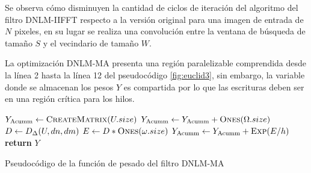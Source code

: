 Se observa c\'omo disminuyen la cantidad de ciclos de iteración del algoritmo del filtro DNLM-IIFFT respecto a la versión original para una imagen de entrada  de $N$ pixeles, en su lugar se realiza una convolución entre la ventana de búsqueda \mat{\Omega} de tama\~no $S$ y el vecindario de tama\~no $W$. 

La optimización DNLM-MA presenta una región paralelizable comprendida desde la línea 2 hasta la línea 12 del pseudoc\'odigo \ref{fig:euclid3}, sin embargo, la variable donde se almacenan los pesos $Y$ es compartida por lo que las escrituras deben ser en una región crítica para los hilos. 


\begin{algorithm}[htbp]
\begin{algorithmic}[1]
\State $Y_{\text{Acumm}}\gets \Call{CreateMatrix}{U.size}$
			\State $Y_{\text{Acumm}}\gets Y_{\text{Acumm}} + \Call{Ones}{\Omega.size}$
		\Else
			\State $D\gets \Call{$D_{\Delta}$}{U,dn,dm}$  
			\State $E\gets D * \Call{Ones}{\omega.size}$ 
			\State $Y_{\text{Acumm}}\gets Y_{\text{Acumm}} + \Call{Exp}{E/h}$ 
		\EndIf
	\EndFor
\EndFor
\State \textbf{return} $Y$
\end{algorithmic}
\caption{Pseudocódigo de la funci\'on de pesado del filtro DNLM-MA\label{fig:euclid3}}
\end{algorithm}


 

